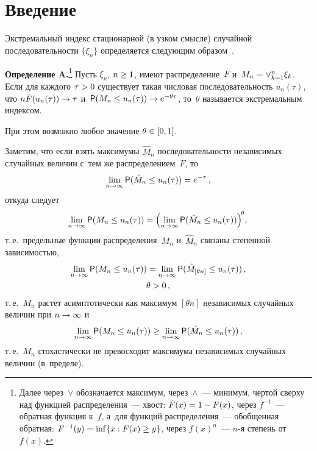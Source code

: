 \begin{multicols}{2}

\label{st\stat}

\section{Введение}

Экстремальный индекс стационарной (в узком смысле) случайной
последовательности $\{\xi_n\}$
определяется следующим образом~\cite[\S 3.7]{LLR}.

\noindent
\textbf{Определение A.}\footnote[2]{Далее через~$\vee$ обозначается максимум,
через~$\wedge$~--- минимум, чертой сверху над функцией распределения~--- хвост:
${\bar F}(x)\hm=1\hm-F(x)$,
через $f^{-1}$~--- обратная функция к~$f$, а~для функций распределения~---
обобщенная обратная:
$F^{-1}(y)\hm=\inf\{x:F(x)\hm\ge y\}$, через $f(x)^n$~--- $n$-я степень от $f(x)$.}
Пусть $\xi_n$, $n\hm\ge 1$, имеют распределение~$F$ и~$M_n\hm=\vee_{k=1}^n\xi_k$.
Если для каждого $\tau\hm>0$ существует такая числовая
последовательность $u_n(\tau)$, что $n{\bar F}(u_n(\tau))\hm\to \tau$
и~${\sf P}(M_n\le u_n(\tau))\hm\to e^{-\theta\tau}$,
то~$\theta$ называется экстремальным индексом.

\smallskip

При этом возможно любое значение $\theta\hm\in [0,1]$.

Заметим, что если взять максимумы ${\hat M}_n$ последовательности
независимых случайных величин с~тем же распределением~$F$, то
$$
\lim_{n\to\infty}{\sf P}({\hat M}_n\le u_n(\tau))=e^{-\tau}\,,
$$
откуда следует
\begin{equation}
\hspace*{-2mm}\lim\limits_{n\to\infty}{\sf P}(M_n\le u_n(\tau))=
\left(\lim\limits_{n\to\infty}{\sf P}({\hat M}_n\le u_n(\tau))\right)^{\!\theta}\!,\!\!
\label{Mfunc}
\end{equation}
т.\,е.\ предельные функции распределения~$M_n$ и~${\hat M}_n$ связаны
степенной зависимостью,
\begin{multline}
\label{Mtheta}
\lim\limits_{n\to\infty}{\sf P}(M_n\le u_n(\tau))=
\lim\limits_{n\to\infty}{\sf P}({\hat M}_{[\theta n]}\le u_n(\tau))\,,\\
\theta>0\,,
\end{multline}
т.\,е.\ $M_n$ растет асимптотически как максимум $[\theta n]$
независимых случайных величин при $n\hm\to\infty$ и
\begin{equation}
\label{Mhat}
\lim\limits_{n\to\infty}{\sf P}(M_n\le u_n(\tau))\ge \lim\limits_{n\to\infty}{\sf P}({\hat M}_n\le u_n(\tau))\,,
\end{equation}
т.\,е.\ $M_n$ стохастически не превосходит максимума независимых
случайных величин (в~пределе).


\end{multicols}
